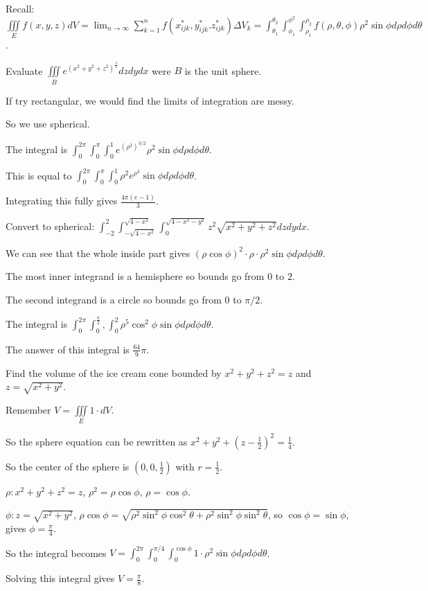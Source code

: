 \documentclass[../calc3.tex]{subfiles}
\begin{document}
Recall: $\iiint\limits_{E} f(x,y,z)dV = \lim_{n\to\infty}\sum_{k=1}^n f\left(x_{ijk}^*,y_{ijk}^*.z_{ijk}^*\right)\Delta V_k = \int_{\theta_1}^{\theta_2}\int_{\phi_1}^{\phi^2}\int_{\rho_1}^{\rho_2} f(\rho,\theta,\phi)\rho^2 \sin\phi d\rho d\phi d\theta$.

\begin{example}
    Evaluate $\iiint\limits_{B} e^{(x^2+y^2+z^2)^{\frac{3}{2}}}dz dy dx$ were $B$ is the unit sphere.

    If try rectangular, we would find the limits of integration are messy.

    So we use spherical.

    The integral is $\int_0^{2\pi}\int_0^{\pi}\int_0^1 e^{(\rho^2)^{3/2}}\rho^2 \sin\phi d\rho d\phi d\theta$.

    This is equal to $\int_0^{2\pi}\int_0^{\pi}\int_0^1 \rho^2 e^{\rho^3}\sin\phi d\rho d\phi d\theta$.

    Integrating this fully gives $\frac{4\pi(e-1)}{3}$.
\end{example}

\begin{example}
    Convert to spherical: $\int_{-2}^2 \int_{-\sqrt{4-x^2}}^{\sqrt{4-x^2}}\int_{0}^{\sqrt{4-x^2-y^2}}z^2 \sqrt{x^2+y^2+z^2}dzdydx$.

    We can see that the whole inside part gives $(\rho\cos\phi)^2\cdot \rho \cdot \rho^2 \sin\phi d\rho d\phi d\theta$.

    The most inner integrand is a hemisphere so bounds go from $0$ to $2$.

    The second integrand is a circle so bounds go from $0$ to $\pi/2$.

    The integral is $\int_0^{2\pi}\int_0^{\frac{\pi}{2}},\int_0^2 \rho^5 \cos^2\phi\sin\phi d\rho d\phi d\theta$.

    The answer of this integral is $\frac{64}{9}\pi$.
\end{example}


\begin{example}
    Find the volume of the ice cream cone bounded by $x^2+y^2+z^2=z$ and $z=\sqrt{x^2+y^2}$.

    Remember $V=\iiint\limits_{E} 1\cdot dV$.

    So the sphere equation can be rewritten as $x^2+y^2+\left(z-\frac{1}{2}\right)^2=\frac{1}{4}$.

    So the center of the sphere is $\left(0,0,\frac{1}{2}\right)$ with $r=\frac{1}{2}$.

    $\rho: x^2+y^2+z^2=z$, $\rho^2 = \rho\cos\phi$, $\rho=\cos\phi$.

    $\phi: z=\sqrt{x^2+y^2}$, $\rho\cos\phi = \sqrt{\rho^2\sin^2\phi\cos^2\theta+\rho^2\sin^2\phi\sin^2\theta}$, so $\cos\phi = \sin\phi$, gives $\phi = \frac{\pi}{4}$.

    So the integral becomes $V=\int_0^{2\pi}\int_0^{\pi/4}\int_0^{\cos\phi}1\cdot \rho^2 \sin\phi d\rho d\phi d\theta$.

    Solving this integral gives $V=\frac{\pi}{8}$.
\end{example}
\end{document}
